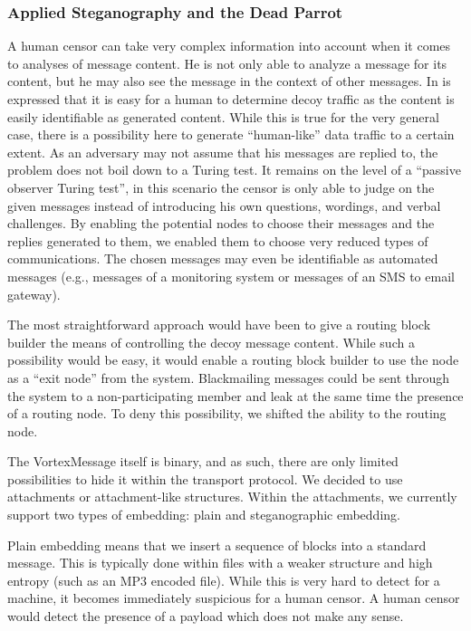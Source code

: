 \documentclass[10pt,journal,compsoc]{IEEEtran}
\begin{document}
\subsubsection{Applied Steganography and the Dead Parrot}
A human censor can take very complex information into account when it comes to analyses of message content. He is not only able to analyze a message for its content, but he may also see the message in the context of other messages. In \cite{oakland2013-parrot} is expressed that it is easy for a human to determine decoy traffic as the content is easily identifiable as generated content. While this is true for the very general case, there is a possibility here to generate ``human-like'' data traffic to a certain extent. As an adversary may not assume that his messages are replied to, the problem does not boil down to a Turing test. It remains on the level of a ``passive observer Turing test'', in this scenario the censor is only able to judge on the given messages instead of introducing his own questions, wordings, and verbal challenges. By enabling the potential nodes to choose their messages and the replies generated to them, we enabled them to choose very reduced types of communications. The chosen messages may even be identifiable as automated messages (e.g., messages of a monitoring system or messages of an SMS to email gateway). 

The most straightforward approach would have been to give a routing block builder the means of controlling the decoy message content. While such a possibility would be easy, it would enable a routing block builder to use the node as a ``exit node'' from the system. Blackmailing messages could be sent through the system to a non-participating member and leak at the same time the presence of a routing node. To deny this possibility, we shifted the ability to the routing node.

The VortexMessage itself is binary, and as such, there are only limited possibilities to hide it within the transport protocol. We decided to use attachments or attachment-like structures. Within the attachments, we currently support two types of embedding: plain and steganographic embedding. 

Plain embedding means that we insert a sequence of blocks into a standard message. This is typically done within files with a weaker structure and high entropy (such as an MP3 encoded file). While this is very hard to detect for a machine, it becomes immediately suspicious for a human censor. A human censor would detect the presence of a payload which does not make any sense.
\end{document}
